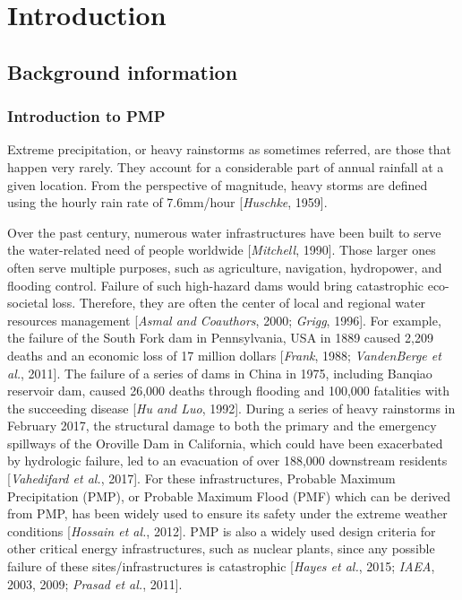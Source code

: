 \chapter {Introduction}
\label{ch:intro}

\section {Background information}

\subsection{Introduction to PMP}

Extreme precipitation, or heavy rainstorms as sometimes referred, are those that happen very rarely. They account for a considerable part of annual rainfall at a given location. From the perspective of magnitude, heavy storms are defined using the hourly rain rate of 7.6mm/hour [\textit{Huschke}, 1959].

Over the past century, numerous water infrastructures have been built to serve the water-related need of people worldwide [\textit{Mitchell}, 1990]. Those larger ones often serve multiple purposes, such as agriculture, navigation, hydropower, and flooding control. Failure of such high-hazard dams would bring catastrophic eco-societal loss. Therefore, they are often the center of local and regional water resources management [\textit{Asmal and Coauthors}, 2000; \textit{Grigg}, 1996]. For example, the failure of the South Fork dam in Pennsylvania, USA in 1889 caused 2,209 deaths and an economic loss of 17 million dollars [\textit{Frank}, 1988; \textit{VandenBerge et al.}, 2011].  The failure of a series of dams in China in 1975, including Banqiao reservoir dam, caused 26,000 deaths through flooding and 100,000 fatalities with the succeeding disease [\textit{Hu and Luo}, 1992]. During a series of heavy rainstorms in February 2017, the structural damage to both the primary and the emergency spillways of the Oroville Dam in California, which could have been exacerbated by hydrologic failure, led to an evacuation of over 188,000 downstream residents [\textit{Vahedifard et al.}, 2017]. For these infrastructures, Probable Maximum Precipitation (PMP), or Probable Maximum Flood (PMF) which can be derived from PMP,  has been widely used to ensure its safety under the extreme weather conditions [\textit{Hossain et al.}, 2012]. PMP is also a widely used design criteria for other critical energy infrastructures, such as nuclear plants, since any possible failure of these sites/infrastructures is catastrophic [\textit{Hayes et al.}, 2015; \textit{IAEA}, 2003, 2009; \textit{Prasad et al.}, 2011].

